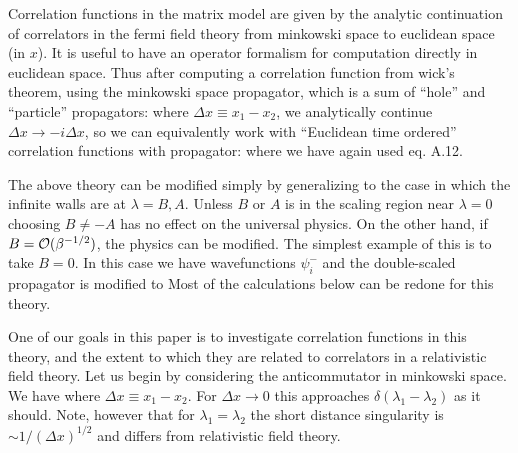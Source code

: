 Correlation functions in the matrix model are given by the 
analytic continuation of correlators in the fermi field theory 
from minkowski space to euclidean space (in $x$). It is useful to 
have an operator formalism for computation directly in euclidean 
space. Thus after computing a correlation function from wick's 
theorem, using the minkowski space propagator, which is a 
sum of ``hole'' and ``particle'' propagators:
\eqn{}
where $\Delta x\equiv x_1-x_2$, 
we analytically continue $\Delta x\to -i \Delta x$, so we can 
equivalently work with  ``Euclidean time ordered'' correlation 
functions with propagator:
\eqn{}
where we have again used eq. A.12.


The above theory can be modified simply by generalizing to 
the case in which the infinite walls are at $\lambda=B,A$.
Unless $B$ or $A$ is in the scaling region near $\lambda=0$
choosing $B\not=-A$ has no effect on the universal physics. 
On the other hand, if $B={\cal O}(\beta^{-1/2})$, the physics 
can be modified. The simplest example of this is to take
$B=0$. In this case we have wavefunctions $\psi_i^-$ and 
the double-scaled propagator is modified to 
\eqn{}
Most of the calculations below can be redone for this theory.
  

One of our goals in this paper is to investigate 
correlation functions in this theory, and the extent to which they 
are related to correlators in a relativistic field theory. 
Let us begin by considering the anticommutator in minkowski space.
We have
\eqn{}
where $\Delta x\equiv x_1-x_2$. For $\Delta x\to 0$ this 
approaches $\delta(\lambda_1-\lambda_2)$ as it should. Note, however
that for $\lambda_1=\lambda_2$ the short distance singularity is 
$\sim 1/(\Delta x)^{1/2}$ and differs from relativistic field theory.

